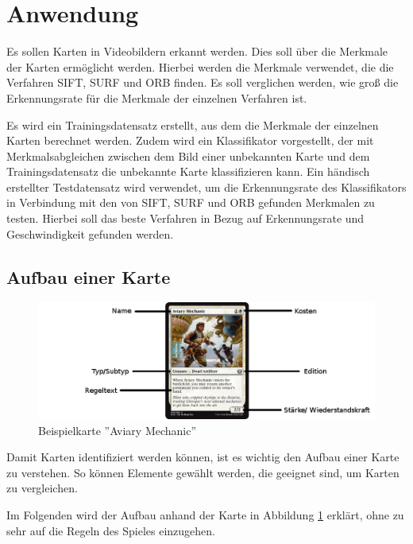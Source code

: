 \section{Anwendung}\raggedbottom 

Es sollen Karten in Videobildern erkannt werden. Dies soll über die Merkmale der Karten ermöglicht werden. Hierbei werden die Merkmale verwendet, die die Verfahren SIFT, SURF und ORB finden. Es soll verglichen werden, wie groß die Erkennungsrate für die Merkmale der einzelnen Verfahren ist.

Es wird ein Trainingsdatensatz erstellt, aus dem die Merkmale der einzelnen Karten berechnet werden.
Zudem wird ein Klassifikator vorgestellt, der mit Merkmalsabgleichen zwischen dem Bild einer unbekannten Karte und dem Trainingsdatensatz die unbekannte Karte klassifizieren kann.
Ein händisch erstellter Testdatensatz wird verwendet, um die Erkennungsrate des Klassifikators in Verbindung mit den von SIFT, SURF und ORB gefunden Merkmalen zu testen. Hierbei soll das beste Verfahren in Bezug auf Erkennungsrate und Geschwindigkeit gefunden werden.


\subsection{Aufbau einer Karte}

\begin{figure}[h]
    \centering
		\includegraphics[scale=0.5]{bilder/sampleCard.png}
    	\caption{Beispielkarte ''Aviary Mechanic''}
    	\label{fig:sampleCard}
\end{figure}

Damit Karten identifiziert werden können, ist es wichtig den Aufbau einer Karte zu verstehen. So können Elemente gewählt werden, die geeignet sind, um Karten zu vergleichen.

Im Folgenden wird der Aufbau anhand der Karte in Abbildung \ref{fig:sampleCard} erklärt, ohne zu sehr auf die Regeln des Spieles einzugehen.

